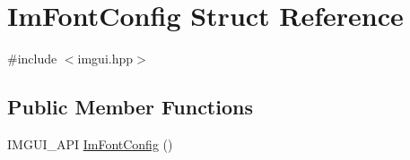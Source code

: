 \hypertarget{struct_im_font_config}{}\section{Im\+Font\+Config Struct Reference}
\label{struct_im_font_config}


{\ttfamily \#include $<$imgui.\+hpp$>$}

\subsection*{Public Member Functions}
\begin{DoxyCompactItemize}
\item 
I\+M\+G\+U\+I\+\_\+\+A\+PI \hyperlink{struct_im_font_config_af56ce39ce94ce0fb5171f4d8aa93f79c}{Im\+Font\+Config} ()
\end{DoxyCompactItemize}

